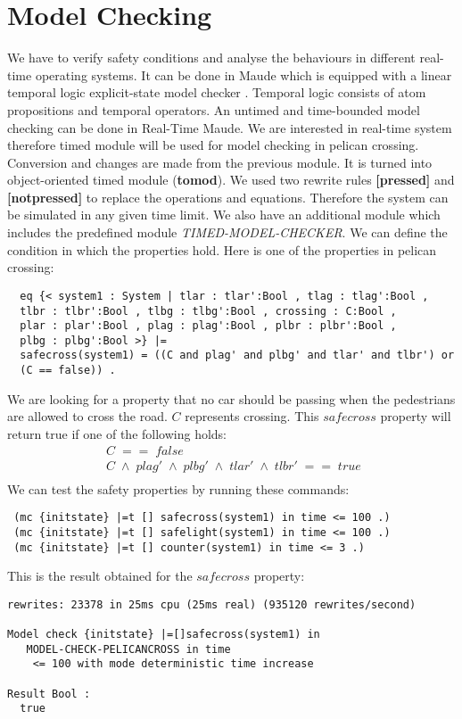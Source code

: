 \documentclass[a4paper,11pt]{report}
\begin{document}
\section{Model Checking}
\label{sec:mc}
We have to verify safety conditions and analyse the behaviours in different real-time operating systems. It can be done in Maude which is equipped with a linear temporal logic explicit-state model checker \cite{ltlmc}. Temporal logic consists of atom propositions and temporal operators. An untimed and time-bounded model checking can be done in Real-Time Maude. We are interested in real-time system therefore timed module will be used for model checking in pelican crossing. Conversion and changes are made from the previous module. It is turned into object-oriented timed module (\textbf{tomod}). We used two rewrite rules \textbf{[pressed]} and \textbf{[notpressed]} to replace the operations and equations. Therefore the system can be simulated in any given time limit. We also have an additional module which includes the predefined module \textit{TIMED-MODEL-CHECKER}. We can define the condition in which the properties hold. Here is one of the properties in pelican crossing: 
\begin{verbatim}
  eq {< system1 : System | tlar : tlar':Bool , tlag : tlag':Bool ,
  tlbr : tlbr':Bool , tlbg : tlbg':Bool , crossing : C:Bool , 
  plar : plar':Bool , plag : plag':Bool , plbr : plbr':Bool ,
  plbg : plbg':Bool >} |= 
  safecross(system1) = ((C and plag' and plbg' and tlar' and tlbr') or 
  (C == false)) .
\end{verbatim}
We are looking for a property that no car should be passing when the pedestrians are allowed to cross the road. $C$ represents crossing. This $safecross$ property will return true if one of the following holds:
\begin{gather*}
\;C\;==\;false\\
\;C\;\wedge\;plag'\;\wedge\;plbg'\;\wedge\;tlar'\;\wedge\;tlbr'\;==\;true\\
\end{gather*}
We can test the safety properties by running these commands:
\begin{verbatim} (mc {initstate} |=t [] safecross(system1) in time <= 100 .) 
 (mc {initstate} |=t [] safelight(system1) in time <= 100 .) 
 (mc {initstate} |=t [] counter(system1) in time <= 3 .) 
\end{verbatim}
This is the result obtained for the $safecross$ property:
\begin{lstlisting}[frame=single,linewidth=15cm]
rewrites: 23378 in 25ms cpu (25ms real) (935120 rewrites/second)

Model check {initstate} |=[]safecross(system1) in 
   MODEL-CHECK-PELICANCROSS in time
    <= 100 with mode deterministic time increase                                   

Result Bool :                                                                      
  true
\end{lstlisting}
\end{document}
